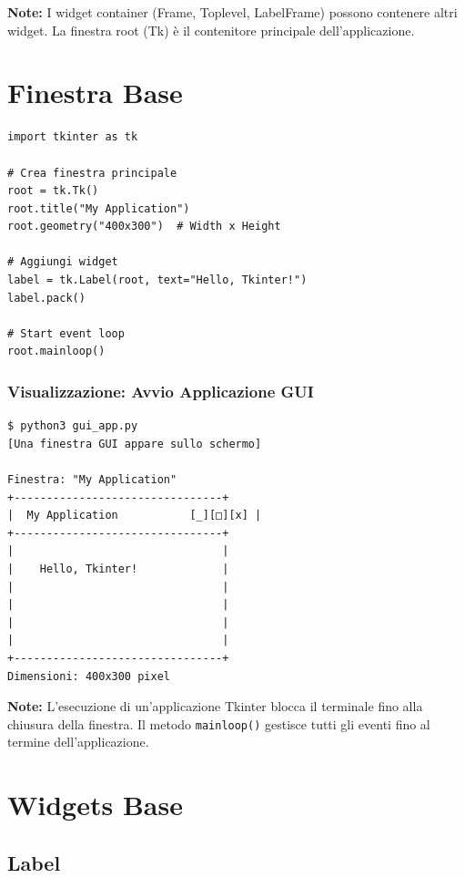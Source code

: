 \textbf{Note:} I widget container (Frame, Toplevel, LabelFrame) possono contenere altri widget. La finestra root (Tk) è il contenitore principale dell'applicazione.

\section{Finestra Base}

\begin{lstlisting}
import tkinter as tk

# Crea finestra principale
root = tk.Tk()
root.title("My Application")
root.geometry("400x300")  # Width x Height

# Aggiungi widget
label = tk.Label(root, text="Hello, Tkinter!")
label.pack()

# Start event loop
root.mainloop()
\end{lstlisting}

\subsubsection{Visualizzazione: Avvio Applicazione GUI}

\begin{tcolorbox}[title=Output Terminale]
\begin{verbatim}
$ python3 gui_app.py
[Una finestra GUI appare sullo schermo]

Finestra: "My Application"
+--------------------------------+
|  My Application           [_][□][x] |
+--------------------------------+
|                                |
|    Hello, Tkinter!             |
|                                |
|                                |
|                                |
|                                |
+--------------------------------+
Dimensioni: 400x300 pixel
\end{verbatim}
\end{tcolorbox}

\textbf{Note:} L'esecuzione di un'applicazione Tkinter blocca il terminale fino alla chiusura della finestra. Il metodo \verb|mainloop()| gestisce tutti gli eventi fino al termine dell'applicazione.

\section{Widgets Base}

\subsection{Label}

